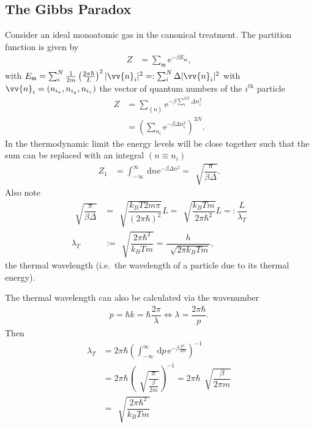 \documentclass[a4paper,10pt]{article}
\newcommand{\td}{\,\text{d}}
\numberwithin{equation}{section}
\begin{document}
\begin{multicols}{2}
\subsection{The Gibbs Paradox}
Consider an ideal monoatomic gas in the canonical treatment.
The partition function is given by
\begin{align} 
  Z &= \sum_{\mathfrak{m}}^{}\text{e}^{-\beta E_\mathfrak{m}}
,\end{align} 
with $E_\mathfrak{m}=\sum_{i}^{N}\tfrac{1}{2m}\left(\tfrac{2\pi \hbar }{L}\right)^2|\vv{n}_i|^2=:\sum_{i}^{N}\Delta |\vv{n}_i|^2$ with $\vv{n}_i=(n_{i_x}, n_{i_y}, n_{i_z})$ the vector of quantum numbers of the $i^\text{th}$ particle
\begin{align} 
  Z &= \sum_{ \left\{n\right\}}^{}\text{e}^{-\beta \sum_{i}^{3N}\Delta n_i^2}\\
    &= \left(\sum_{n_i}^{}\text{e}^{-\beta \Delta n_i^2}\right)^{3N}
.\end{align} 
In the thermodynamic limit the energy levels will be close together such that the sum can be replaced with an integral $(n\equiv n_i)$ 
\begin{align} 
  Z_1 &= \int_{-\infty}^{\infty}\td n \text{e}^{-\beta \Delta n^2} = \,\sqrt[]{\dfrac{\pi }{\beta \Delta }}
.\end{align} 
Also note
\begin{align} 
  \,\sqrt[]{\dfrac{\pi }{\beta \Delta }} &= \,\sqrt[]{\dfrac{k_BT2m\pi }{(2\pi \hbar )^2}}L = \,\sqrt[]{\dfrac{k_BTm}{2\pi \hbar ^2}}L =: \dfrac{L}{\lambda _T}\\
  \lambda _T &:= \,\sqrt[]{\dfrac{2\pi \hbar ^2}{k_BTm}} = \dfrac{h}{\,\sqrt[]{2\pi k_BTm}}
,\end{align} 
the thermal wavelength (i.e.\ the wavelength of a particle due to its thermal energy).

\footnotesize
The thermal wavelength can also be calculated via the wavenumber
\begin{align} 
  p = \hbar k = \hbar \dfrac{2\pi }{\lambda } \Leftrightarrow \lambda =\dfrac{2\pi \hbar }{p}
.\end{align} 
Then
\begin{align} 
  \lambda _T&= 2\pi \hbar \left(\int_{-\infty}^{\infty}\td p\, \text{e}^{-\beta \tfrac{p^2}{2m}}\right)^{-1}\\
            &= 2\pi \hbar \left(\,\sqrt[]{\dfrac{\pi }{\tfrac{\beta }{2m}}}\right)^{-1} = 2\pi \hbar \,\sqrt[]{\dfrac{\beta }{2\pi m}}\\
            &= \,\sqrt[]{\dfrac{2\pi \hbar ^2}{k_BTm}}
\end{align} 


\end{multicols}
\end{document}
